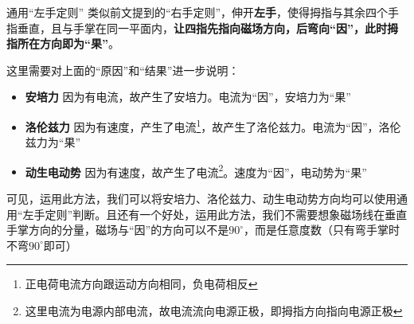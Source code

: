 \begin{theo}{通用“左手定则”}{}
类似前文提到的“右手定则”，伸开\textbf{左手}，使得拇指与其余四个手指垂直，且与手掌在同一平面内，\textbf{让四指先指向磁场方向，后弯向“因”，此时拇指所在方向即为“果”}。

这里需要对上面的“原因”和“结果”进一步说明：

\begin{itemize}
	\item \textbf{安培力} \quad 因为有电流，故产生了安培力。电流为“因”，安培力为“果”
	\item \textbf{洛伦兹力} \quad 因为有速度，产生了电流\footnote{正电荷电流方向跟运动方向相同，负电荷相反}，故产生了洛伦兹力。电流为“因”，洛伦兹力为“果”
	\item \textbf{动生电动势} \quad 因为有速度，故产生了电流\footnote{这里电流为电源内部电流，故电流流向电源正极，即拇指方向指向电源正极}。速度为“因”，电动势为“果”
\end{itemize}

\end{theo}

可见，运用此方法，我们可以将安培力、洛伦兹力、动生电动势方向均可以使用通用“左手定则”判断。且还有一个好处，运用此方法，我们不需要想象磁场线在垂直手掌方向的分量，磁场与“因”的方向可以不是$90^{\circ}$，而是任意度数（只有弯手掌时不弯$90^{\circ}$即可）